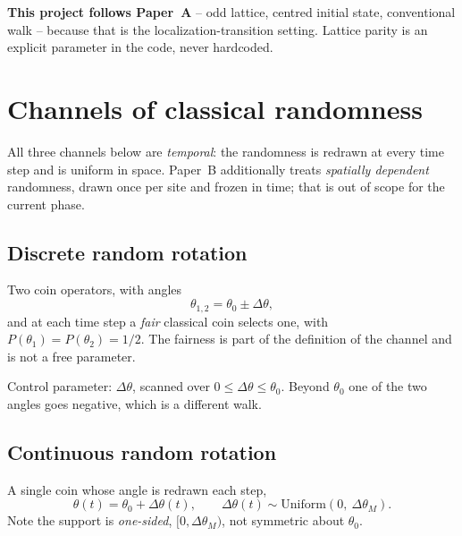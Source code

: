 \documentclass[11pt]{article}
\newcommand{\dtheta}{\Delta\theta}                  %
\newcommand{\dthetaM}{\Delta\theta_{M}}             %
\begin{document}
\noindent
\textbf{This project follows Paper~A} -- odd lattice, centred initial state,
conventional walk -- because that is the localization-transition setting.
Lattice parity is an explicit parameter in the code, never hardcoded.

\section{Channels of classical randomness}
\label{sec:channels}

All three channels below are \emph{temporal}: the randomness is redrawn at
every time step and is uniform in space. Paper~B additionally treats
\emph{spatially dependent} randomness, drawn once per site and frozen in
time; that is out of scope for the current phase.

\subsection{Discrete random rotation}
\label{sec:ch-discrete}
Two coin operators, with angles
\begin{equation}
\theta_{1,2} = \theta_0 \pm \dtheta ,
\label{eq:discrete-coin}
\end{equation}
and at each time step a \emph{fair} classical coin selects one, with
$P(\theta_1)=P(\theta_2)=1/2$. The fairness is part of the definition of the
channel and is not a free parameter.

\noindent Control parameter: $\dtheta$, scanned over $0 \le \dtheta \le \theta_0$.
Beyond $\theta_0$ one of the two angles goes negative, which is a different walk.

\subsection{Continuous random rotation}
\label{sec:ch-continuous}
A single coin whose angle is redrawn each step,
\begin{equation}
\theta(t) = \theta_0 + \dtheta(t),
\qquad
\dtheta(t) \sim \mathrm{Uniform}\!\left(0,\ \dthetaM\right).
\label{eq:continuous-coin}
\end{equation}
Note the support is \emph{one-sided}, $[0,\dthetaM)$, not symmetric about
$\theta_0$.
\end{document}
